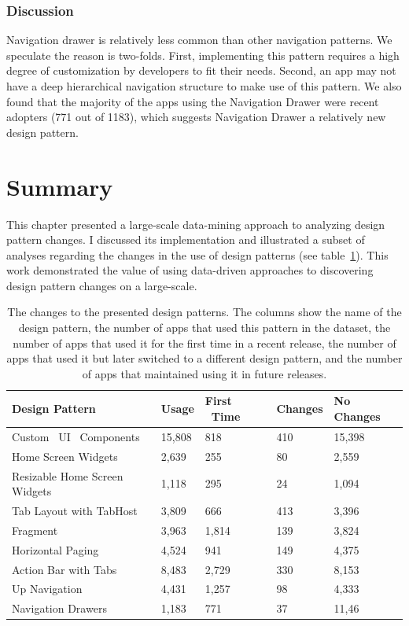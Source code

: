 \subsubsection{Discussion}
Navigation drawer is relatively less common than other navigation patterns. 
We speculate the reason is two-folds. 
First, implementing this pattern requires a high degree of customization by developers to fit their needs. Second, an app may not have a deep hierarchical navigation structure to make use of this pattern. 
We also found that the majority of the apps using the Navigation Drawer were recent adopters (771 out of 1183), which suggests Navigation Drawer a relatively new design pattern.

\section{Summary}
This chapter presented a large-scale data-mining approach to analyzing design pattern changes.
I discussed its implementation and illustrated a subset of analyses regarding the changes in the use of design patterns (see table~\ref{tab:table_summary}).
This work demonstrated the value of using data-driven approaches to discovering design pattern changes on a large-scale.

\begin{table}[!htbp]
	\def\arraystretch{2}
	\begin{tabular}{| >{\centering\arraybackslash}m{6cm} | m{2cm} | m{2cm} | m{2cm} | m{2cm} |}
		\hline
		\centering \textbf{Design Pattern} & \textbf{Usage} & \textbf{First \ Time} & \textbf{Changes} & \textbf{No Changes} \\
		\hline
		Custom \ UI \ Components & 15,808 & 818 & 410 & 15,398 \tabularnewline
		\hline
		Home Screen Widgets & 2,639 & 255 & 80 & 2,559 \tabularnewline
		\hline
		Resizable Home Screen Widgets & 1,118 & 295 & 24 & 1,094 \tabularnewline
		\hline
		Tab Layout with TabHost & 3,809 & 666 & 413 & 3,396 \tabularnewline
		\hline
		Fragment & 3,963 & 1,814 & 139 & 3,824 \tabularnewline
		\hline
		Horizontal Paging & 4,524 & 941 & 149 & 4,375 \tabularnewline
		\hline
		Action Bar with Tabs & 8,483 & 2,729 & 330 & 8,153 \tabularnewline
		\hline
		Up Navigation & 4,431 & 1,257 & 98 & 4,333 \tabularnewline
		\hline
		Navigation Drawers & 1,183 & 771 & 37 & 11,46 \tabularnewline
		\hline
	\end{tabular}
	\caption{The changes to the presented design patterns. The columns show the name of the design pattern, the number of apps that used this pattern in the dataset, the number of apps that used it for the first time in a recent release, the number of apps that used it but later switched to a different design pattern, and the number of apps that maintained using it in future releases.}
	\label{tab:table_summary}
\end{table}